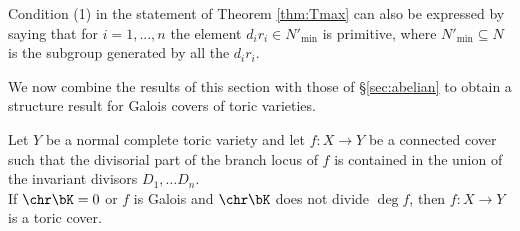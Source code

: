 \documentclass[10pt]{amsart}
\numberwithin{equation}{section}
\begin{document}
\begin{remark} 
Condition (1) in the statement of Theorem \ref{thm:Tmax} can also be expressed by saying that for  $i = 1,...,n$ the element $d_ir_i\in N'_{\min}$  is primitive, where $N'_{\min}\subseteq N$ is the subgroup generated by all  the  $d_ir_i$. 
\end{remark}

We now combine the results of this section with those of \S \ref{sec:abelian} to obtain a structure result for Galois  covers of toric varieties. 
\begin{theorem}\label{thm:abelian-toric}
Let $Y$ be a normal complete toric variety and let   $f\colon X\to Y$  be a connected 
cover such that  the divisorial part of the branch locus of $f$ is contained in the union of the invariant divisors $D_1,\dots D_n$.\\

If $\chr \bK=0$ or $f$ is Galois and  $\chr\bK$ does not divide $\deg f$,  then     $f\colon X\to Y$ is a toric cover.
\end{theorem}
\end{document}
